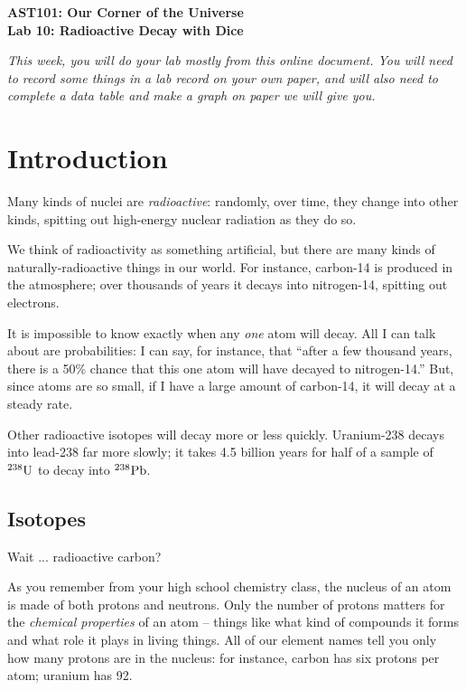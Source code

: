\documentclass[11pt]{article}
\begin{document}
\begin{center}
\textbf{\Large
AST101: Our Corner of the Universe \\
\vspace*{0.1cm}
Lab 10: Radioactive Decay with Dice 
}
\end{center}

\vspace*{0.5cm}

\it This week, you will do your lab mostly from this online document. You will need to record some things in a lab record on your own paper, and will also need to complete a data table and make a graph on paper we will give you.\rm

\section{Introduction}

Many kinds of nuclei are {\it radioactive}: randomly, over time, they change into other kinds, spitting out high-energy nuclear radiation as they do so.

We think of radioactivity as something artificial, but there are many kinds of naturally-radioactive things in our world. For instance, carbon-14 is produced in the atmosphere; over thousands of years it decays into nitrogen-14, spitting out electrons.

It is impossible to know exactly when any {\it one} atom will decay. All I can talk about are probabilities: I can say, for instance, that ``after a few thousand years, there is a 50\% chance that this one atom will have decayed to nitrogen-14.'' 
But, since atoms are so small, if I have a large amount of carbon-14, it will decay at a steady rate.

Other radioactive isotopes will decay more or less quickly. Uranium-238 decays into lead-238 far more slowly; it takes 4.5 billion years for half of a sample of ${}^{238}\rm U$ to decay into ${}^{238}\rm Pb$. 

\subsection{Isotopes}

Wait ... radioactive carbon?

As you remember from your high school chemistry class, the nucleus of an atom is made of both protons and neutrons. Only the number of protons matters for the {\it chemical properties} of an atom -- things like what kind of compounds it forms and 
what role it plays in living things. All of our element names tell you only how many protons are in the nucleus: for instance, carbon has six protons per atom; uranium has 92. 
\end{document}
